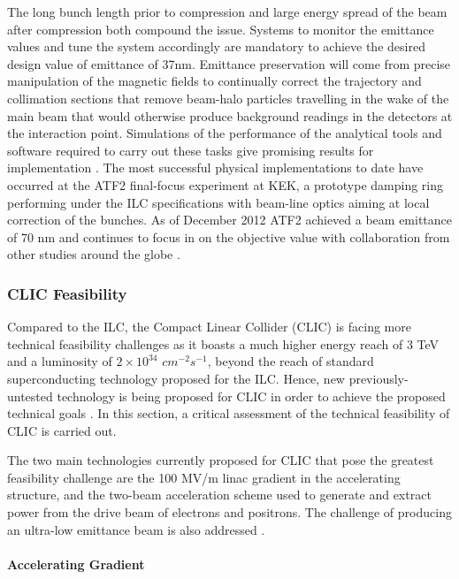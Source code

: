 The long bunch length prior to compression and large energy spread of the beam after compression both compound the issue. Systems to monitor the emittance values and tune the system accordingly are mandatory to achieve the desired design value of emittance of 37nm. Emittance preservation will come from precise manipulation of the magnetic fields to continually correct the trajectory and collimation sections that remove beam-halo particles travelling in the wake of the main beam that would otherwise produce background readings in the detectors at the interaction point. Simulations of the performance of the analytical tools and software required to carry out these tasks give promising results for implementation \cite{PAC:Emittance}. The most successful physical implementations to date have occurred at the ATF2 final-focus experiment at KEK, a prototype damping ring performing under the ILC specifications with beam-line optics aiming at local correction of the bunches. As of December 2012 ATF2 achieved a beam emittance of 70 nm and continues to focus in on the objective value with collaboration from other studies around the globe \cite{ATF2}.

\subsubsection{CLIC Feasibility}

Compared to the ILC, the Compact Linear Collider (CLIC) is facing more technical feasibility challenges as it boasts a much higher energy reach of 3 TeV and a luminosity of $2 \times 10^{34}$ $cm^{-2} s^{-1}$, beyond the reach of standard superconducting technology proposed for the ILC. Hence, new previously-untested technology is being proposed for CLIC in order to achieve the proposed technical goals \cite{CLIC:ArticleSymmetry}. In this section, a critical assessment of the technical feasibility of CLIC is carried out.

The two main technologies currently proposed for CLIC that pose the greatest feasibility challenge are the 100 MV/m linac gradient in the accelerating structure, and the two-beam acceleration scheme used to generate and extract power from the drive beam of electrons and positrons. The challenge of producing an ultra-low emittance beam is also addressed \cite{CLIC:Concept}.

\paragraph{Accelerating Gradient}

